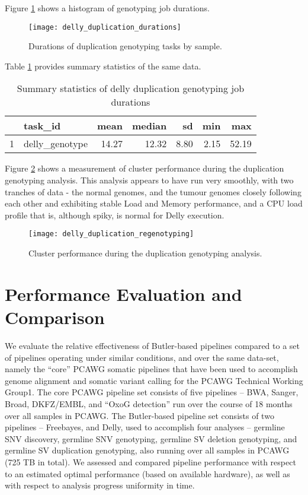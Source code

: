 Figure \ref{fig:delly_duplication_durations} shows a histogram of genotyping job durations.

\begin{figure}[H]
\texttt{[image: delly\_duplication\_durations]}
\centering
\caption {Durations of duplication genotyping tasks by sample.}
\label{fig:delly_duplication_durations}
\end{figure}

Table \ref{tab:delly_duplication_summary_stats} provides summary statistics of the same data.

\begin{table}[H]
\caption {Summary statistics of delly duplication genotyping job durations} \label{tab:delly_duplication_summary_stats}
\centering
\begin{tabular}{rlrrrrr}
  \hline
 & task\_id & mean & median & sd & min & max \\ 
  \hline
1 & delly\_genotype & 14.27 & 12.32 & 8.80 & 2.15 & 52.19 \\ 
   \hline
\end{tabular}
\end{table}

Figure \ref{fig:delly_duplication_regenotyping} shows a measurement of cluster performance during the duplication genotyping analysis. This analysis appears to have run very smoothly, with two tranches of data - the normal genomes, and the tumour genomes closely following each other and exhibiting stable Load and Memory performance, and a CPU load profile that is, although spiky, is normal for Delly execution.

\begin{figure}[H]
\texttt{[image: delly\_duplication\_regenotyping]}
\centering
\caption {Cluster performance during the duplication genotyping analysis.}
\label{fig:delly_duplication_regenotyping}
\end{figure}

\section{Performance Evaluation and Comparison}

We evaluate the relative effectiveness of Butler-based pipelines compared to a set of pipelines operating under similar conditions, and over the same data-set, namely the “core” PCAWG somatic pipelines that have been used to accomplish genome alignment and somatic variant calling for the PCAWG Technical Working Group1. The core PCAWG pipeline set consists of five pipelines – BWA, Sanger, Broad, DKFZ/EMBL, and “OxoG detection” run over the course of 18 months over all samples in PCAWG. The Butler-based pipeline set consists of two pipelines – Freebayes, and Delly, used to accomplish four analyses – germline SNV discovery, germline SNV genotyping, germline SV deletion genotyping, and germline SV duplication genotyping, also running over all samples in PCAWG (725 TB in total). We assessed and compared pipeline performance with respect to an estimated optimal performance (based on available hardware), as well as with respect to analysis progress uniformity in time.

